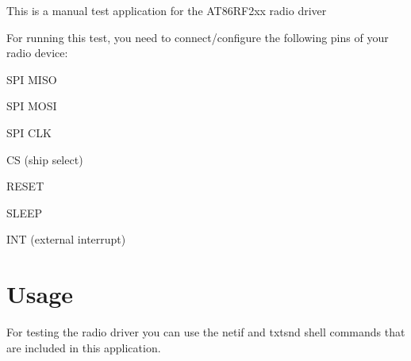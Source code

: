 This is a manual test application for the A\+T86\+R\+F2xx radio driver

For running this test, you need to connect/configure the following pins of your radio device\+:
\begin{DoxyItemize}
\item S\+PI M\+I\+SO
\item S\+PI M\+O\+SI
\item S\+PI C\+LK
\item CS (ship select)
\item R\+E\+S\+ET
\item S\+L\+E\+EP
\item I\+NT (external interrupt)
\end{DoxyItemize}

\section*{Usage}

For testing the radio driver you can use the netif and txtsnd shell commands that are included in this application. 